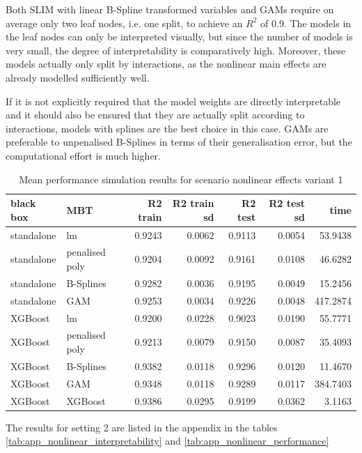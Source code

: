 Both SLIM with linear B-Spline transformed variables and GAMs require on average only two leaf nodes, i.e. one split, to achieve an $R^2$ of $0.9$. The models in the leaf nodes can only be interpreted visually, but since the number of models is very small, the degree of interpretability is comparatively high. Moreover, these models actually only split by interactions, as the nonlinear main effects are already modelled sufficiently well. 

If it is not explicitly required that the model weights are directly interpretable and it should also be ensured that they are actually split according to interactions, models with splines are the best choice in this case. GAMs are preferable to unpenalised B-Splines in terms of their generalisation error, but the computational effort is much higher.




\begin{table}[!htb]

\centering \footnotesize
\begin{tabular}[t]{l|l|r|r|r|r|r}
\hline
black box & MBT & R2 train & R2 train sd & R2 test & R2 test sd & time\\
\hline
standalone & lm & 0.9243 & 0.0062 & 0.9113 & 0.0054 & 53.9438\\
standalone & penalised poly & 0.9204 & 0.0092 & 0.9161 & 0.0108 & 46.6282\\
standalone & B-Splines & 0.9282 & 0.0036 & 0.9195 & 0.0049 & 15.2456\\
standalone & GAM & 0.9253 & 0.0034 & 0.9226 & 0.0048 & 417.2874\\
\hline
XGBoost & lm & 0.9200 & 0.0228 & 0.9023 & 0.0190 & 55.7771\\
XGBoost & penalised poly & 0.9213 & 0.0079 & 0.9150 & 0.0087 & 35.4093\\
XGBoost & B-Splines & 0.9382 & 0.0118 & 0.9296 & 0.0120 & 11.4670\\
XGBoost & GAM & 0.9348 & 0.0118 & 0.9289 & 0.0117 & 384.7403\\
\hline
XGBoost & XGBoost & 0.9386 & 0.0295 & 0.9199 & 0.0362 & 3.1163\\
\hline
\end{tabular}
\caption{Mean performance simulation results for scenario nonlinear effects variant 1}

\end{table}






The results for setting 2 are listed in the appendix in the tables \ref{tab:app_nonlinear_interpretability} and \ref{tab:app_nonlinear_performance}